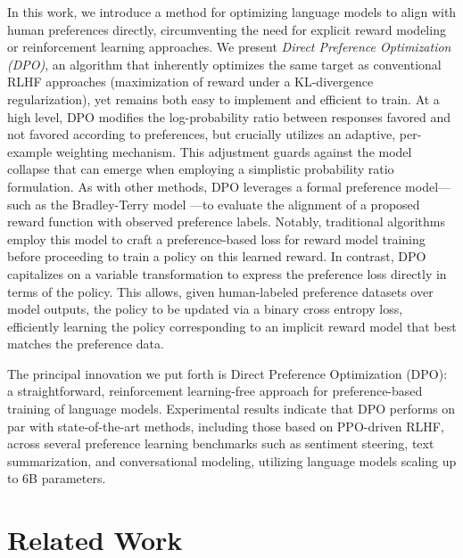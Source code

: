 In this work, we introduce a method for optimizing language models to align with human preferences directly, circumventing the need for explicit reward modeling or reinforcement learning approaches. We present \textit{{Direct Preference Optimization} (DPO)}, an algorithm that inherently optimizes the same target as conventional RLHF approaches (maximization of reward under a KL-divergence regularization), yet remains both easy to implement and efficient to train. At a high level, DPO modifies the log-probability ratio between responses favored and not favored according to preferences, but crucially utilizes an adaptive, per-example weighting mechanism. This adjustment guards against the model collapse that can emerge when employing a simplistic probability ratio formulation. As with other methods, DPO leverages a formal preference model—such as the Bradley-Terry model \cite{bradley1952rankanalysis}—to evaluate the alignment of a proposed reward function with observed preference labels. Notably, traditional algorithms employ this model to craft a preference-based loss for reward model training before proceeding to train a policy on this learned reward. In contrast, DPO capitalizes on a variable transformation to express the preference loss directly in terms of the policy. This allows, given human-labeled preference datasets over model outputs, the policy to be updated via a binary cross entropy loss, efficiently learning the policy corresponding to an implicit reward model that best matches the preference data.

The principal innovation we put forth is Direct Preference Optimization (DPO): a straightforward, reinforcement learning-free approach for preference-based training of language models. Experimental results indicate that DPO performs on par with state-of-the-art methods, including those based on PPO-driven RLHF, across several preference learning benchmarks such as sentiment steering, text summarization, and conversational modeling, utilizing language models scaling up to 6B parameters.

\section{Related Work}


